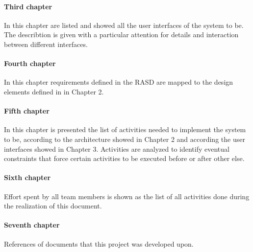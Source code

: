 \documentclass[../DD.tex]{subfiles}
\begin{document}
		\paragraph{Third chapter}
			In this chapter are listed and showed all the user interfaces of the system to be. The describtion is given with a particular attention for details and interaction between different interfaces.
		\paragraph{Fourth chapter}
			In this chapter requirements defined in the RASD are mapped to the design elements defined in in Chapter 2.
		\paragraph{Fifth chapter}
			In this chapter is presented the list of activities needed to implement the system to be, according to the architecture showed in Chapter 2 and according the user interfaces showed in Chapter 3. Activities are analyzed to identify eventual constraints that force certain activities to be executed before or after other else. 
		\paragraph{Sixth chapter}
			Eﬀort spent by all team members is shown as the list of all activities done during the realization of this document.
		\paragraph{Seventh chapter}
			References of documents that this project was developed upon.
		
\end{document}
